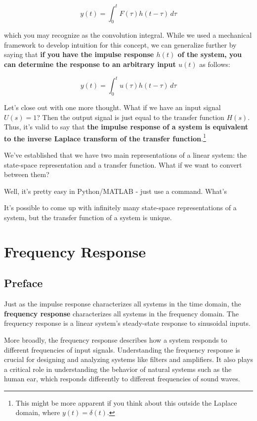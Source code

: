 \documentclass[
  letterpaper,
  DIV=11,
  numbers=noendperiod]{scrreprt}
\begin{document}
\[y(t) = \int_0^t  F(\tau) h(t-\tau) \, d\tau\]

which you may recognize as the convolution integral. While we used a
mechanical framework to develop intuition for this concept, we can
generalize further by saying that \textbf{if you have the impulse
response \(h(t)\) of the system, you can determine the response to an
arbitrary input \(u(t)\)} as follows:

\[y(t) = \int_0^t u(\tau) h(t-\tau) \, d\tau\]

Let's close out with one more thought. What if we have an input signal
\(U(s) = 1\)? Then the output signal is just equal to the transfer
function \(H(s)\). Thus, it's valid to say that \textbf{the impulse
response of a system is equivalent to the inverse Laplace transform of
the transfer function}.\footnote{This might be more apparent if you
  think about this outside the Laplace domain, where
  \(y(t) = \delta(t)\).}

We've established that we have two main representations of a linear
system: the state-space representation and a transfer function. What if
we want to convert between them?

Well, it's pretty easy in Python/MATLAB - just use a command. What's

It's possible to come up with infinitely many state-space
representations of a system, but the transfer function of a system is
unique.


\hypertarget{frequency-response}{%
\chapter{Frequency Response}\label{frequency-response}}

\hypertarget{preface-3}{%
\section*{Preface}\label{preface-3}}


Just as the impulse response characterizes all systems in the time
domain, the \textbf{frequency response} characterizes all systems in the
frequency domain. The frequency response is a linear system's
steady-state response to sinusoidal inputs.

More broadly, the frequency response describes how a system responds to
different frequencies of input signals. Understanding the frequency
response is crucial for designing and analyzing systems like filters and
amplifiers. It also plays a critical role in understanding the behavior
of natural systems such as the human ear, which responds differently to
different frequencies of sound waves.
\end{document}
